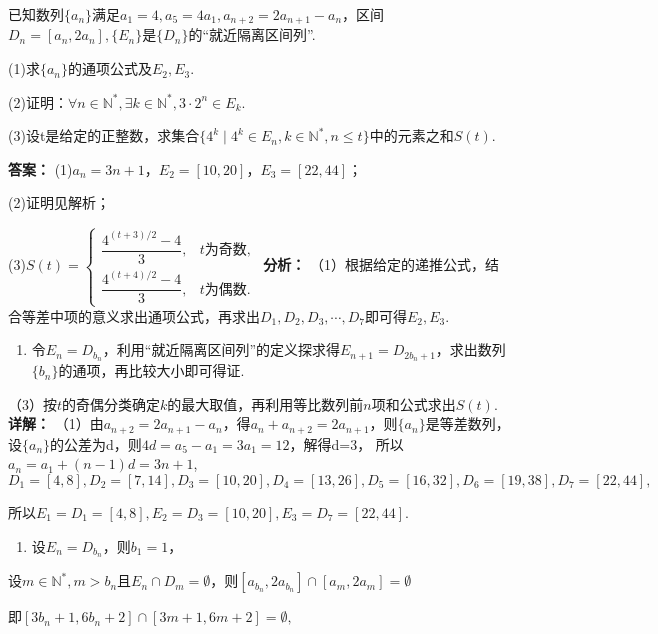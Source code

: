 \documentclass[11pt,a4paper]{ctexart}
\begin{document}
已知数列\(\{a_{n}\}\)满足\(a_{1}=4,a_{5}=4a_{1},a_{n+2}=2a_{n+1}-a_{n}\)，区间\(D_{n}=[a_{n},2a_{n}],\{E_{n}\}\)是\(\{D_{n}\}\)的``就近隔离区间列''.

(1)求\(\{a_{n}\}\)的通项公式及\(E_{2},E_{3}\).

(2)证明：\(\forall n\in \mathbb{N}^{*},\exists k\in \mathbb{N}^{*},3\cdot 2^{n}\in E_{k}.\)

(3)设t是给定的正整数，求集合\(\{4^{k}\mid4^{k}\in E_{n},k\in \mathbb{N}^{*},n\leq t\}\)中的元素之和\(S(t)\).

\textbf{答案：}
(1)\(a_n=3n+1\)，\(E_2=[10,20]\)，\(E_3=[22,44]\)；

(2)证明见解析；

(3)\(S(t)=\begin{cases}\dfrac{4^{(t+3)/2}-4}{3},&t\text{为奇数},\\[
4pt]\dfrac{4^{(t+4)/2}-4}{3},&t\text{为偶数}.\end{cases}\)
\textbf{分析：}
（1）根据给定的递推公式，结合等差中项的意义求出通项公式，再求出\(D_{1},D_{2},D_{3},\cdots,D_{7}\)即可得\(E_{2},E_{3}\).
\begin{enumerate}[label=\arabic*., leftmargin=*, start=2]
\item 令\(E_n = D_{b_n}\)，利用``就近隔离区间列''的定义探求得\(E_{n+1} = D_{2b_n+1}\)，求出数列\(\{b_n\}\)的通项，再比较大小即可得证.
\end{enumerate}
（3）按\(t\)的奇偶分类确定\(k\)的最大取值，再利用等比数列前\(n\)项和公式求出\(S(t)\).
\textbf{详解：}
（1）由\(a_{n+2}=2a_{n+1}-a_{n}\)，得\(a_{n}+a_{n+2}=2a_{n+1}\)，则\(\{a_{n}\}\)是等差数列，
设\(\{a_{n}\}\)的公差为d，则\(4d=a_{5}-a_{1}=3a_{1}=12\)，解得d=3，
所以\(a_{n}=a_{1}+(n-1)d=3n+1\),
\[
D _ {1} = [ 4, 8 ], D _ {2} = [ 7, 1 4 ], D _ {3} = [ 1 0, 2 0 ], D _ {4} = [ 1 3, 2 6 ], D _ {5} = [ 1 6, 3 2 ], D _ {6} = [ 1 9, 3 8 ], D _ {7} = [ 2 2, 4 4 ],
\]

所以\(E_{1}=D_{1}=[4,8],E_{2}=D_{3}=[10,20],E_{3}=D_{7}=[22,44].\)

\begin{enumerate}[label=\arabic*., leftmargin=*, start=2]
\item 设\(E_{n}=D_{b_{n}}\)，则\(b_{1}=1\)，
\end{enumerate}

设\(m \in \mathbb{N}^{*}, m > b_{n}\)且\(E_{n} \cap D_{m} = \emptyset\)，则\([a_{b_{n}}, 2a_{b_{n}}] \cap [a_{m}, 2a_{m}] = \emptyset\)

即\([3b_{n} + 1,6b_{n} + 2]\cap [3m + 1,6m + 2] = \emptyset ,\)
\end{document}
